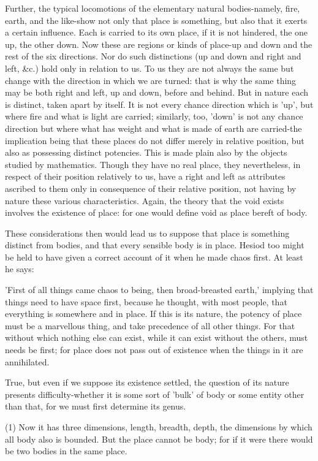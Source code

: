 Further, the typical locomotions of the elementary natural bodies-namely,
fire, earth, and the like-show not only that place is something, but
also that it exerts a certain influence. Each is carried to its own
place, if it is not hindered, the one up, the other down. Now these
are regions or kinds of place-up and down and the rest of the six
directions. Nor do such distinctions (up and down and right and left,
&c.) hold only in relation to us. To us they are not always the same
but change with the direction in which we are turned: that is why
the same thing may be both right and left, up and down, before and
behind. But in nature each is distinct, taken apart by itself. It
is not every chance direction which is 'up', but where fire and what
is light are carried; similarly, too, 'down' is not any chance direction
but where what has weight and what is made of earth are carried-the
implication being that these places do not differ merely in relative
position, but also as possessing distinct potencies. This is made
plain also by the objects studied by mathematics. Though they have
no real place, they nevertheless, in respect of their position relatively
to us, have a right and left as attributes ascribed to them only in
consequence of their relative position, not having by nature these
various characteristics. Again, the theory that the void exists involves
the existence of place: for one would define void as place bereft
of body. 

These considerations then would lead us to suppose that place is something
distinct from bodies, and that every sensible body is in place. Hesiod
too might be held to have given a correct account of it when he made
chaos first. At least he says: 

'First of all things came chaos to being, then broad-breasted earth,'
implying that things need to have space first, because he thought,
with most people, that everything is somewhere and in place. If this
is its nature, the potency of place must be a marvellous thing, and
take precedence of all other things. For that without which nothing
else can exist, while it can exist without the others, must needs
be first; for place does not pass out of existence when the things
in it are annihilated. 

True, but even if we suppose its existence settled, the question of
its nature presents difficulty-whether it is some sort of 'bulk' of
body or some entity other than that, for we must first determine its
genus. 

(1) Now it has three dimensions, length, breadth, depth, the dimensions
by which all body also is bounded. But the place cannot be body; for
if it were there would be two bodies in the same place. 

